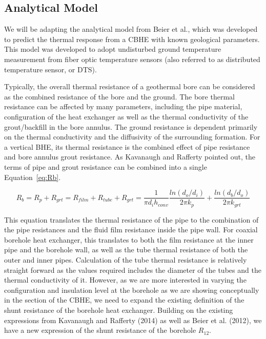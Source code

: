 \subsection{Analytical Model}
	We will be adapting the analytical model from Beier et al., which was developed to predict the thermal response from a CBHE with known geological parameters. This model was developed to adopt undisturbed ground temperature measurement from fiber optic temperature sensors (also referred to as distributed temperature sensor, or DTS). 
	
	Typically, the overall thermal resistance of a geothermal bore can be considered as the combined resistance of the bore and the ground. The bore thermal resistance can be affected by many parameters, including the pipe material, configuration of the heat exchanger as well as the thermal conductivity of the grout/backfill in the bore annulus. The ground resistance is dependent primarily on the thermal conductivity and the diffusivity of the surrounding formation. For a vertical BHE, its thermal resistance is the combined effect of pipe resistance and bore annulus grout resistance. As Kavanaugh and Rafferty pointed out, the terms of pipe and grout resistance can be combined into a single Equation~\ref{eq:Rb}. 
	
	\begin{equation}
		R_b = R_p + R_{grt} = R_{film} + R_{tube} + R_{grt} = 
		\frac{1}{\pi d_i h_{conv}} \frac{ln(d_o/d_i)}{2\pi k_p} + \frac{ln(d_b/d_o)}{2\pi k_{grt}}\label{Rb}
	\end{equation}
	
	This equation translates the thermal resistance of the pipe to the combination of the pipe resistances and the fluid film resistance inside the pipe wall. For coaxial borehole heat exchanger, this translates to both the film resistance at the inner pipe and the borehole wall, as well as the tube thermal resistance of both the outer and inner pipes. Calculation of the tube thermal resistance is relatively straight forward as the values required includes the diameter of the tubes and the thermal conductivity of it. However, as we are more interested in varying the configuration and insulation level at the borehole as we are showing conceptually in the section of the CBHE, we need to expand the existing definition of the shunt resistance of the borehole heat exchanger. Building on the existing expressions from Kavanaugh and Rafferty (2014) as well as Beier et al. (2012), we have a new expression of the shunt resistance of the borehole $R_{12}$. 

